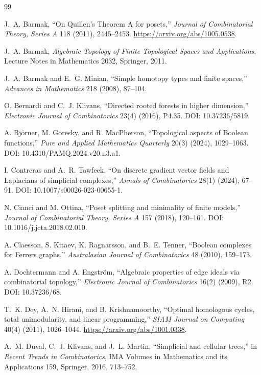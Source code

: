 \documentclass[11pt]{article}
\theoremstyle{definition}
\theoremstyle{remark}
\begin{document}
\begin{thebibliography}{99}

J.~A. Barmak,
``On Quillen's Theorem A for posets,''
\emph{Journal of Combinatorial Theory, Series A} 118 (2011), 2445--2453.
\url{https://arxiv.org/abs/1005.0538}.

J.~A. Barmak,
\emph{Algebraic Topology of Finite Topological Spaces and Applications},
Lecture Notes in Mathematics 2032, Springer, 2011.

J.~A. Barmak and E.~G. Minian,
``Simple homotopy types and finite spaces,''
\emph{Advances in Mathematics} 218 (2008), 87--104.

O. Bernardi and C.~J. Klivans,
``Directed rooted forests in higher dimension,''
\emph{Electronic Journal of Combinatorics} 23(4) (2016), P4.35.
DOI: 10.37236/5819.

A. Bj\"orner, M. Goresky, and R. MacPherson,
``Topological aspects of Boolean functions,''
\emph{Pure and Applied Mathematics Quarterly} 20(3) (2024), 1029--1063.
DOI: 10.4310/PAMQ.2024.v20.n3.a1.

I. Contreras and A.~R. Tawfeek,
``On discrete gradient vector fields and Laplacians of simplicial complexes,''
\emph{Annals of Combinatorics} 28(1) (2024), 67--91.
DOI: 10.1007/s00026-023-00655-1.

N. Cianci and M. Ottina,
``Poset splitting and minimality of finite models,''
\emph{Journal of Combinatorial Theory, Series A} 157 (2018), 120--161.
DOI: 10.1016/j.jcta.2018.02.010.

A. Claesson, S. Kitaev, K. Ragnarsson, and B.~E. Tenner,
``Boolean complexes for Ferrers graphs,''
\emph{Australasian Journal of Combinatorics} 48 (2010), 159--173.

A. Dochtermann and A. Engstr\"om,
``Algebraic properties of edge ideals via combinatorial topology,''
\emph{Electronic Journal of Combinatorics} 16(2) (2009), R2.
DOI: 10.37236/68.

T.~K. Dey, A.~N. Hirani, and B. Krishnamoorthy,
``Optimal homologous cycles, total unimodularity, and linear programming,''
\emph{SIAM Journal on Computing} 40(4) (2011), 1026--1044.
\url{https://arxiv.org/abs/1001.0338}.

A.~M. Duval, C.~J. Klivans, and J.~L. Martin,
``Simplicial and cellular trees,'' in \emph{Recent Trends in Combinatorics},
IMA Volumes in Mathematics and its Applications 159, Springer, 2016, 713--752.


\end{thebibliography}
\end{document}
